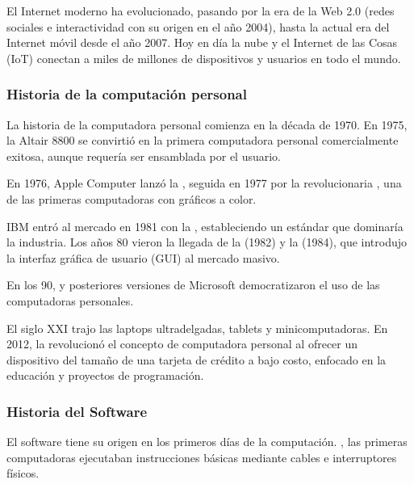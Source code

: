 \documentclass[letterpaper,10pt,spanish]{sphinxmanual}
\begin{document}
\sphinxAtStartPar
El Internet moderno ha evolucionado, pasando por la era de la Web 2.0 (redes sociales e interactividad con su origen en el año 2004), hasta la actual era del Internet móvil desde el año 2007. Hoy en día la nube y el Internet de las Cosas (IoT) conectan a miles de millones de dispositivos y usuarios en todo el mundo.


\subsubsection{Historia de la computación personal}
\label{\detokenize{1_guias/10informatica/G1009:historia-de-la-computacion-personal}}
\sphinxAtStartPar
La historia de la computadora personal comienza en la década de 1970. En 1975, la Altair 8800 se convirtió en la primera computadora personal comercialmente exitosa, aunque requería ser ensamblada por el usuario.

\sphinxAtStartPar
En 1976, Apple Computer lanzó la , seguida en 1977 por la revolucionaria , una de las primeras computadoras con gráficos a color.

\sphinxAtStartPar
IBM entró al mercado en 1981 con la , estableciendo un estándar que dominaría la industria. Los años 80 vieron la llegada de la  (1982) y la  (1984), que introdujo la interfaz gráfica de usuario (GUI) al mercado masivo.

\sphinxAtStartPar
En los 90,  y posteriores versiones de Microsoft democratizaron el uso de las computadoras personales.

\sphinxAtStartPar
El siglo XXI trajo las laptops ultra\sphinxhyphen{}delgadas, tablets y mini\sphinxhyphen{}computadoras. En 2012, la  revolucionó el concepto de computadora personal al ofrecer un dispositivo del tamaño de una tarjeta de crédito a bajo costo, enfocado en la educación y proyectos de programación.


\subsubsection{Historia del Software}
\label{\detokenize{1_guias/10informatica/G1009:historia-del-software}}
\sphinxAtStartPar
El software tiene su origen en los primeros días de la computación. , las primeras computadoras ejecutaban instrucciones básicas mediante cables e interruptores físicos.
\end{document}
